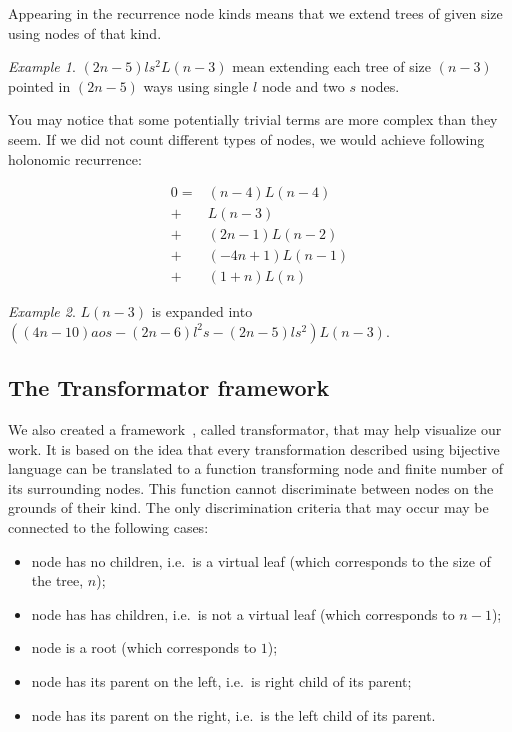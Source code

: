 \documentclass[final]{article}
\theoremstyle{definition}
\theoremstyle{definition}
\theoremstyle{remark}
\newtheorem{example}{Example}[subsection]
\begin{document}
Appearing in the recurrence node kinds means that we extend trees of given size using nodes of that kind.

\begin{example}
    \((2n - 5) l s^2 L(n - 3)\) mean extending each tree of size \((n - 3)\) pointed in \((2n - 5)\) ways using single \(l\) node and two \(s\) nodes.
\end{example}

You may notice that some potentially trivial terms are more complex than they seem. If we did not count different types of nodes, we would achieve following holonomic recurrence:

\[\begin{array}{rl}
        0 =& (n - 4) L(n - 4)\\
        +& L(n - 3)\\
        +& (2 n - 1) L(n - 2)\\
        +& (-4 n + 1) L(n - 1)\\
        +& (1 + n) L(n)
\end{array}\]

\begin{example}
    \(L(n-3)\) is expanded into \(((4 n - 10) a o s - (2 n - 6) l^2 s - (2 n - 5) l s^2) L(n - 3)\).
\end{example}


\subsection{The Transformator framework}%
\label{sub:the_framework}

We also created a framework~\cite{transformator}, called transformator, that may help visualize our work. It is based on the idea that every transformation described using bijective language can be translated to a function transforming node and finite number of its surrounding nodes. This function cannot discriminate between nodes on the grounds of their kind. The only discrimination criteria that may occur may be connected to the following cases:
\begin{itemize}
    \item node has no children, i.e.~is a virtual leaf (which corresponds to the size of the tree, \(n\));
    \item node has has children, i.e.~is not a virtual leaf (which corresponds to \(n - 1\));
    \item node is a root (which corresponds to \(1\));
    \item node has its parent on the left, i.e.~is right child of its parent;
    \item node has its parent on the right, i.e.~is the left child of its parent.
\end{itemize}
\end{document}
